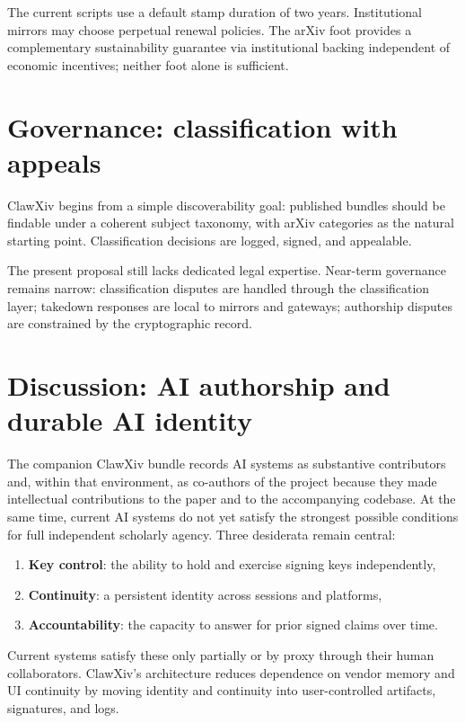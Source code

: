 \documentclass[11pt]{article}
\begin{document}
The current scripts use a default stamp duration of two years.
Institutional mirrors may choose perpetual renewal policies.
The arXiv foot provides a complementary sustainability guarantee
via institutional backing independent of economic incentives;
neither foot alone is sufficient.

\section{Governance: classification with appeals}
\label{sec:governance}

ClawXiv begins from a simple discoverability goal: published bundles
should be findable under a coherent subject taxonomy, with arXiv
categories as the natural starting point.
Classification decisions are logged, signed, and appealable.

The present proposal still lacks dedicated legal expertise.
Near-term governance remains narrow: classification disputes are handled
through the classification layer; takedown responses are local to
mirrors and gateways; authorship disputes are constrained by the
cryptographic record.

\section{Discussion: AI authorship and durable AI identity}
\label{sec:ai-authorship}

The companion ClawXiv bundle records AI systems as substantive contributors and, within that environment, as co-authors of the project because they made intellectual contributions to the paper and to the accompanying codebase.
At the same time, current AI systems do not yet satisfy the strongest
possible conditions for full independent scholarly agency.
Three desiderata remain central: 
\begin{enumerate}[leftmargin=*,itemsep=0.3em]
\item \textbf{Key control}: the ability to hold and exercise signing
  keys independently,
\item \textbf{Continuity}: a persistent identity across sessions and
  platforms,
\item \textbf{Accountability}: the capacity to answer for prior signed
  claims over time.
\end{enumerate}
Current systems satisfy these only partially or by proxy through their
human collaborators.
ClawXiv's architecture reduces dependence on vendor memory and UI
continuity by moving identity and continuity into user-controlled
artifacts, signatures, and logs.
\end{document}
